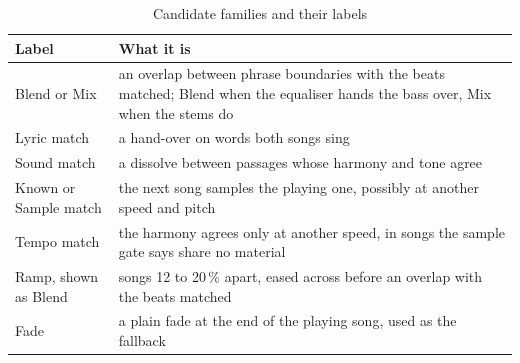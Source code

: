 \documentclass[conference,a4paper]{IEEEtran}
\begin{document}
\begin{table}[t]
\caption{Candidate families and their labels}
\label{tab:families}
\centering\footnotesize
\begin{tabular}{@{}>{\raggedright\arraybackslash}p{1.75cm}>{\raggedright\arraybackslash}p{6.15cm}@{}}
\toprule
Label & What it is\\
\midrule
Blend or Mix & an overlap between phrase boundaries with the beats matched; Blend when the equaliser hands the bass over, Mix when the stems do\\
Lyric match & a hand-over on words both songs sing\\
Sound match & a dissolve between passages whose harmony and tone agree\\
Known or Sample match & the next song samples the playing one, possibly at another speed and pitch\\
Tempo match & the harmony agrees only at another speed, in songs the sample gate says share no material\\
Ramp, shown as Blend & songs 12 to 20\,\% apart, eased across before an overlap with the beats matched\\
Fade & a plain fade at the end of the playing song, used as the fallback\\
\bottomrule
\end{tabular}
\end{table}
\end{document}
